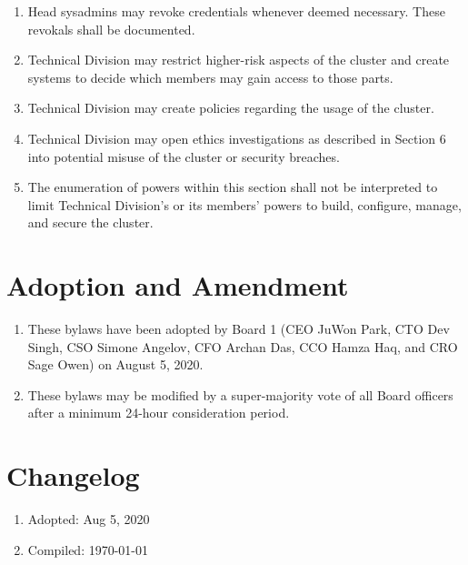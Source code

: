 \documentclass{article}
\begin{document}
\begin{enumerate}
    \item Head sysadmins may revoke credentials whenever deemed necessary. These revokals shall be documented.
    \item Technical Division may restrict higher-risk aspects of the cluster and create systems to decide which members may gain access to those parts.
    \item Technical Division may create policies regarding the usage of the cluster.
    \item Technical Division may open ethics investigations as described in Section 6 into potential misuse of the cluster or security breaches.
    \item The enumeration of powers within this section shall not be interpreted to limit Technical Division's or its members' powers to  build, configure, manage, and secure the cluster.
\end{enumerate}
\section{Adoption and Amendment}
\begin{enumerate}
    \item These bylaws have been adopted by Board 1 (CEO JuWon Park, CTO Dev Singh, CSO Simone Angelov, CFO Archan Das, CCO Hamza Haq, and CRO Sage Owen) on August 5, 2020.
    \item These bylaws may be modified by a super-majority vote of all Board officers after a minimum 24-hour consideration period.
\end{enumerate}
\section{Changelog}
\begin{enumerate}
    \item Adopted: Aug 5, 2020
    \item Compiled: \today
\end{enumerate}
\end{document}
